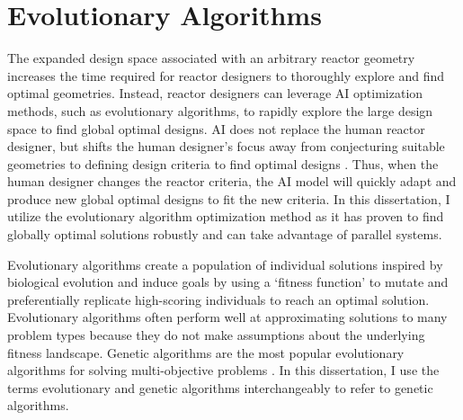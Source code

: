 \section{Evolutionary Algorithms} 
\label{sec:ea}
The expanded design space associated with an arbitrary reactor geometry increases 
the time required for reactor designers to thoroughly explore and find optimal geometries.
Instead, reactor designers can leverage \gls{AI} optimization methods, such as evolutionary 
algorithms, to rapidly explore the large design space to find global optimal 
designs. 
\gls{AI} does not replace the human reactor designer, but shifts the human 
designer's focus away from conjecturing suitable geometries to defining design 
criteria to find optimal designs \cite{sobes_artificial_2020}. 
Thus, when the human designer changes the reactor criteria, the \gls{AI} 
model will quickly adapt and produce new global optimal designs to fit the new 
criteria.  
In this dissertation, I utilize the evolutionary algorithm optimization method as 
it has proven to find globally optimal solutions robustly and can take 
advantage of parallel systems. 

Evolutionary algorithms create a population of individual solutions inspired 
by biological evolution and induce goals by using a `fitness function' to 
mutate and preferentially replicate high-scoring individuals to reach an 
optimal solution.
Evolutionary algorithms often perform well at approximating solutions to many 
problem types because they do not make assumptions about the 
underlying fitness landscape.
Genetic algorithms are the most popular evolutionary algorithms for solving 
multi-objective problems \cite{byrne_evolving_2014, krish_practical_2011}. 
In this dissertation, I use the terms evolutionary and genetic algorithms 
interchangeably to refer to genetic algorithms.

